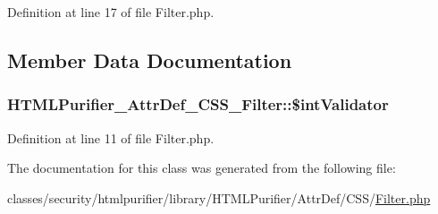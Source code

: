 Definition at line 17 of file Filter.\+php.



\subsection{Member Data Documentation}
\hypertarget{classHTMLPurifier__AttrDef__CSS__Filter_a3871246e8ca0c94a91efddeb818d45af}{
\subsubsection[{\$int\+Validator}]{\setlength{\rightskip}{0pt plus 5cm}H\+T\+M\+L\+Purifier\+\_\+\+Attr\+Def\+\_\+\+C\+S\+S\+\_\+\+Filter\+::\$int\+Validator\hspace{0.3cm}{\ttfamily [protected]}}}\label{classHTMLPurifier__AttrDef__CSS__Filter_a3871246e8ca0c94a91efddeb818d45af}


Definition at line 11 of file Filter.\+php.



The documentation for this class was generated from the following file\+:\begin{DoxyCompactItemize}
\item 
classes/security/htmlpurifier/library/\+H\+T\+M\+L\+Purifier/\+Attr\+Def/\+C\+S\+S/\hyperlink{AttrDef_2CSS_2Filter_8php}{Filter.\+php}\end{DoxyCompactItemize}
